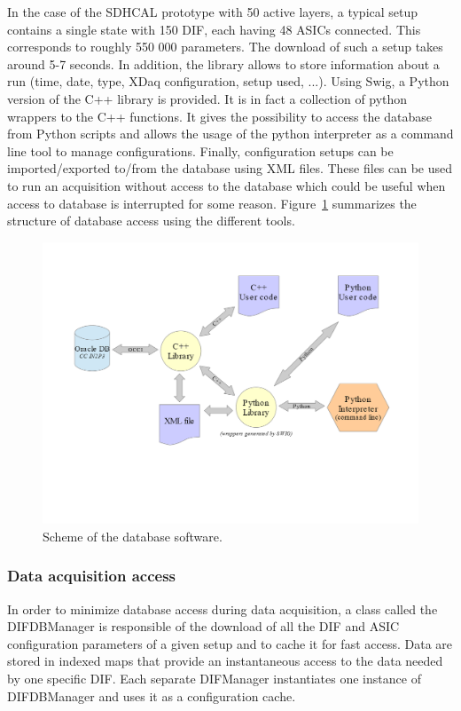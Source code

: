 \documentclass[english]{article}
\begin{document}
In the case of the SDHCAL prototype with 50 active layers, a typical setup contains a single state with 150 DIF,
each having 48 ASICs connected. This corresponds to roughly 550 000
parameters. The download of such a setup takes around 5-7 seconds.
In addition, the library allows to store information about a run
(time, date, type, XDaq configuration, setup used, ...). Using Swig,
a Python version of the C++ library is provided. It is in fact a collection
of python wrappers to the C++ functions. It gives the possibility
to access the database from Python scripts and allows the usage of
the python interpreter as a command line tool to manage configurations.
Finally, configuration setups can be imported/exported to/from the
database using XML files. These files can be used to run an acquisition
without access to the database which could be useful when access to database is interrupted for some reason.
Figure~\ref{DBSoftWare} summarizes the structure of  database access using the different tools.
\begin{figure}[h]
\centerline{\includegraphics[width=0.9\columnwidth]{./overview.png}}
\caption{Scheme of the database software.}
\label{DBSoftWare}
\end{figure}


\subsubsection{Data acquisition access}

In order to minimize database access during data acquisition, a class called
the DIFDBManager is responsible of the download of all the DIF and ASIC configuration parameters
of a given setup and to cache it for fast access. Data are stored in
indexed maps that provide an instantaneous access to the data needed
by one specific DIF. Each separate DIFManager instantiates one instance
of DIFDBManager and uses it as a configuration cache.
\end{document}
